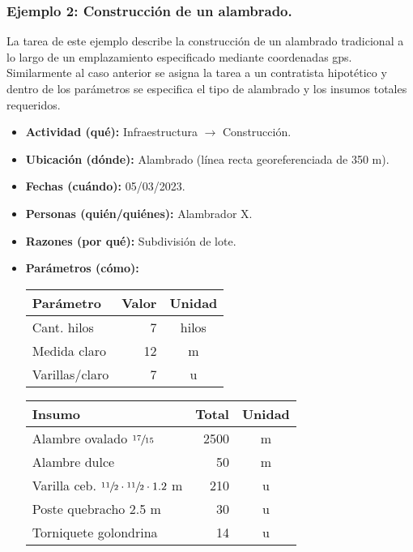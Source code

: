 \subsubsection{Ejemplo 2: Construcción de un alambrado.} La tarea de este ejemplo describe la construcción de un alambrado tradicional a lo largo de un emplazamiento especificado mediante coordenadas gps. Similarmente al caso anterior se asigna la tarea a un contratista hipotético y dentro de los parámetros se especifica el tipo de alambrado y los insumos totales requeridos.

\begin{itemize}
    \item \textbf{Actividad (qué):} Infraestructura $\rightarrow$ Construcción.
    \item \textbf{Ubicación (dónde):} Alambrado (línea recta georeferenciada de 350 m). 
    \item \textbf{Fechas (cuándo):} 05/03/2023.
    \item \textbf{Personas (quién/quiénes):} Alambrador X. 
    \item \textbf{Razones (por qué):} Subdivisión de lote. 
    \item \textbf{Parámetros (cómo):} 

    \begin{center}
        \begin{tabular}{ |l|r|c| } 
            \hline
            \textbf{Parámetro} & \textbf{Valor} & \textbf{Unidad} \\ 
            \hline
            Cant. hilos & 7 & hilos \\  
            Medida claro & 12 & m \\ 
            Varillas/claro & 7 & u \\   
            \hline
        \end{tabular}
        \begin{tabular}{ |l|r|c| } 
            \hline
            \textbf{Insumo} & \textbf{Total} & \textbf{Unidad} \\ 
            \hline
            Alambre ovalado $\sfrac{17}{15}$ & 2500 & m \\ 
            Alambre dulce & 50 & m \\ 
            Varilla ceb. $\sfrac{11}{2}\cdot\sfrac{11}{2}\cdot1.2$ m & 210 & u \\ 
            Poste quebracho 2.5 m & 30 & u \\ 
            Torniquete golondrina & 14 & u \\ 
            \hline
        \end{tabular}
    \end{center}
\end{itemize}

